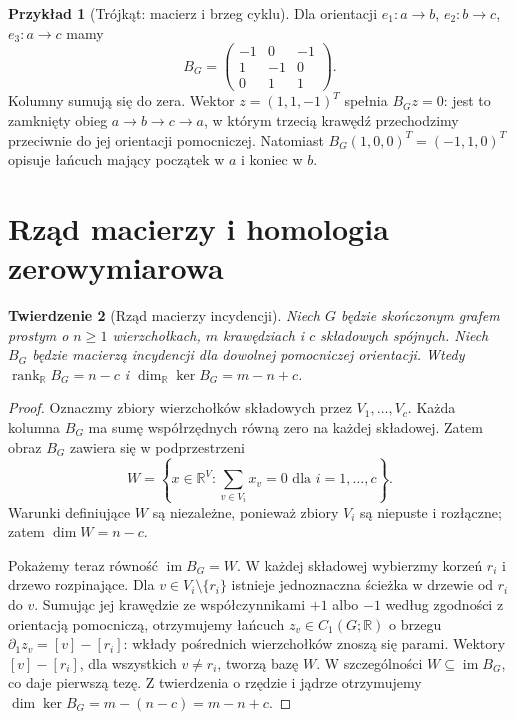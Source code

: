 \documentclass[11pt,a4paper]{report}
\numberwithin{equation}{section}
\theoremstyle{plain}
\newtheorem{twierdzenie}{Twierdzenie}[section]
\theoremstyle{definition}
\newtheorem{przyklad}[twierdzenie]{Przykład}
\theoremstyle{remark}
\begin{document}
\begin{przyklad}[Trójkąt: macierz i brzeg cyklu]
Dla orientacji $e_1:a\to b$, $e_2:b\to c$, $e_3:a\to c$ mamy
\[
B_G=\begin{pmatrix}-1&0&-1\\1&-1&0\\0&1&1\end{pmatrix}.
\]
Kolumny sumują się do zera. Wektor $z=(1,1,-1)^T$ spełnia
$B_Gz=0$: jest to zamknięty obieg $a\to b\to c\to a$, w którym
trzecią krawędź przechodzimy przeciwnie do jej orientacji pomocniczej.
Natomiast $B_G(1,0,0)^T=(-1,1,0)^T$ opisuje łańcuch mający początek
w $a$ i koniec w $b$.
\end{przyklad}

\section{Rząd macierzy i homologia zerowymiarowa}
\label{sec:tg-rank-incidence}

\begin{twierdzenie}[Rząd macierzy incydencji]
\label{thm:tg-rank}
Niech $G$ będzie skończonym grafem prostym o $n\ge1$ wierzchołkach,
$m$ krawędziach i $c$ składowych spójnych. Niech $B_G$ będzie
macierzą incydencji dla dowolnej pomocniczej orientacji. Wtedy
$\operatorname{rank}_{\mathbb R}B_G=n-c$ i
$\dim_{\mathbb R}\ker B_G=m-n+c$.
\end{twierdzenie}

\begin{proof}
Oznaczmy zbiory wierzchołków składowych przez $V_1,\ldots,V_c$.
Każda kolumna $B_G$ ma sumę współrzędnych równą zero na każdej
składowej. Zatem obraz $B_G$ zawiera się w podprzestrzeni
\[
W=\left\{x\in\mathbb R^V:\sum_{v\in V_i}x_v=0
\text{ dla }i=1,\ldots,c\right\}.
\]
Warunki definiujące $W$ są niezależne, ponieważ zbiory $V_i$ są
niepuste i rozłączne; zatem $\dim W=n-c$.

Pokażemy teraz równość $\operatorname{im}B_G=W$.
W każdej składowej wybierzmy korzeń $r_i$ i drzewo rozpinające.
Dla $v\in V_i\setminus\{r_i\}$ istnieje jednoznaczna ścieżka
w drzewie od $r_i$ do $v$. Sumując jej krawędzie ze współczynnikami
$+1$ albo $-1$ według zgodności z orientacją pomocniczą, otrzymujemy
łańcuch $z_v\in C_1(G;\mathbb R)$ o brzegu
$\partial_1z_v=[v]-[r_i]$: wkłady pośrednich wierzchołków znoszą się
parami. Wektory $[v]-[r_i]$, dla wszystkich $v\ne r_i$, tworzą bazę
$W$. W szczególności $W\subseteq\operatorname{im}B_G$, co daje
pierwszą tezę. Z twierdzenia o rzędzie i jądrze otrzymujemy
$\dim\ker B_G=m-(n-c)=m-n+c$.
\end{proof}
\end{document}
